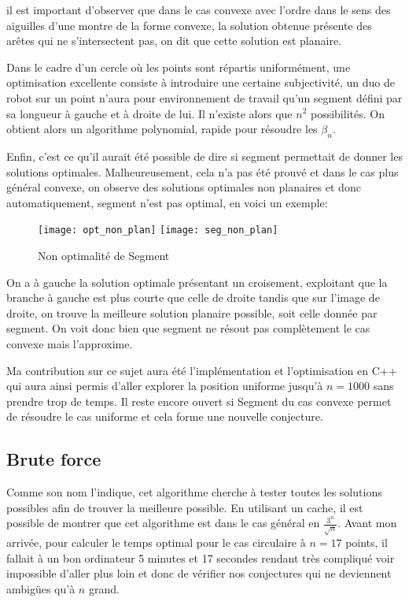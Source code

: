 il est important d'observer que dans le cas convexe avec l'ordre dans le sens des aiguilles d'une montre de la forme convexe, la solution obtenue présente des arêtes qui ne s'intersectent pas, on dit que cette solution est planaire. 

Dans le cadre d'un cercle où les points sont répartis uniformément, une optimisation excellente consiste à introduire une certaine subjectivité, un duo de robot sur un point n'aura pour environnement de travail qu'un segment défini par sa longueur à gauche et à droite de lui. Il n'existe alors que $n^2$ possibilités. On obtient alors un algorithme polynomial, rapide pour résoudre les $\beta_n$. 

Enfin, c'est ce qu'il aurait été possible de dire si segment permettait de donner les solutions optimales. Malheureusement, cela n'a pas été prouvé et dans le cas plus général convexe, on observe des solutions optimales non planaires et donc automatiquement, segment n'est pas optimal, en voici un exemple:

\begin{figure}[h!]
  \centering
  \texttt{[image: opt\_non\_plan]}
  \texttt{[image: seg\_non\_plan]}
  \caption{Non optimalité de Segment}
  \label{fig:segopt}
\end{figure}

On a à gauche la solution optimale présentant un croisement, exploitant que la branche à gauche est plus courte que celle de droite tandis que sur l'image de droite, on trouve la meilleure solution planaire possible, soit celle donnée par segment. On voit donc bien que segment ne résout pas complètement le cas convexe mais l'approxime.

Ma contribution sur ce sujet aura été l'implémentation et l'optimisation en C++ qui aura ainsi permis d'aller explorer la position uniforme jusqu'à $n = 1000$ sans prendre trop de temps. Il reste encore ouvert si Segment du cas convexe permet de résoudre le cas uniforme et cela forme une nouvelle conjecture.

\subsection{Brute force}

Comme son nom l'indique, cet algorithme cherche à tester toutes les solutions possibles afin de trouver la meilleure possible. En utilisant un cache, il est possible de montrer que cet algorithme est dans le cas général en $\frac{3^n}{\sqrt{n}}$. Avant mon arrivée, pour calculer le temps optimal pour le cas circulaire à $n = 17$ points, il fallait à un bon ordinateur 5 minutes et 17 secondes rendant très compliqué voir impossible d'aller plus loin et donc de vérifier nos conjectures qui ne deviennent ambigües qu'à $n$ grand.

